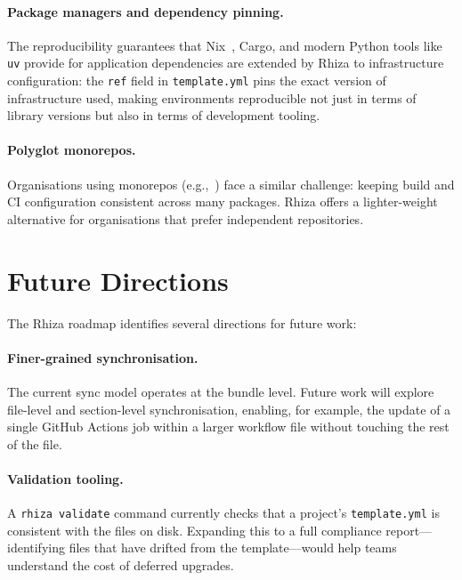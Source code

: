 \documentclass[12pt,a4paper]{article}
\begin{document}
\paragraph{Package managers and dependency pinning.} The reproducibility guarantees that Nix~\cite{dolstra2004nix}, Cargo, and modern Python tools like \texttt{uv} provide for application dependencies are extended by Rhiza to infrastructure configuration: the \texttt{ref} field in \texttt{template.yml} pins the exact version of infrastructure used, making environments reproducible not just in terms of library versions but also in terms of development tooling.

\paragraph{Polyglot monorepos.} Organisations using monorepos (e.g.,~\cite{potvin2016google}) face a similar challenge: keeping build and CI configuration consistent across many packages. Rhiza offers a lighter-weight alternative for organisations that prefer independent repositories.

\section{Future Directions}
\label{sec:future}

The Rhiza roadmap identifies several directions for future work:

\paragraph{Finer-grained synchronisation.} The current sync model operates at the bundle level. Future work will explore file-level and section-level synchronisation, enabling, for example, the update of a single GitHub Actions job within a larger workflow file without touching the rest of the file.

\paragraph{Validation tooling.} A \texttt{rhiza validate} command currently checks that a project's \texttt{template.yml} is consistent with the files on disk. Expanding this to a full compliance report---identifying files that have drifted from the template---would help teams understand the cost of deferred upgrades.
\end{document}
